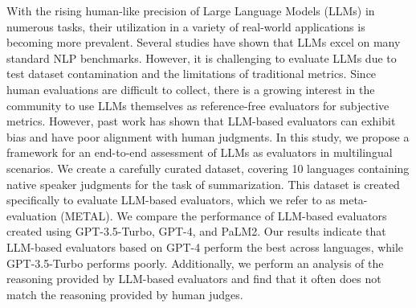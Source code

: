 With the rising human-like precision of Large Language Models (LLMs) in numerous tasks, their utilization in a variety of real-world applications is becoming more prevalent. Several studies have shown that LLMs excel on many standard NLP benchmarks. However, it is challenging to evaluate LLMs due to test dataset  contamination and the limitations of traditional metrics. Since human evaluations are difficult to collect, there is a growing interest in the community to use LLMs themselves as reference-free evaluators for subjective metrics. However, past work has shown that LLM-based evaluators can exhibit bias and have poor alignment with human judgments. In this study, we propose a framework for an end-to-end assessment of LLMs as evaluators in multilingual scenarios. We create a carefully curated dataset, covering 10 languages containing native speaker judgments for the task of summarization. This dataset is created specifically to evaluate LLM-based evaluators, which we refer to as meta-evaluation (METAL). We compare the performance of LLM-based evaluators created using GPT-3.5-Turbo, GPT-4, and PaLM2. Our results indicate that LLM-based evaluators based on GPT-4 perform the best across languages, while GPT-3.5-Turbo performs poorly. Additionally, we perform an analysis of the reasoning provided by LLM-based evaluators and find that it often does not match the reasoning provided by human judges.